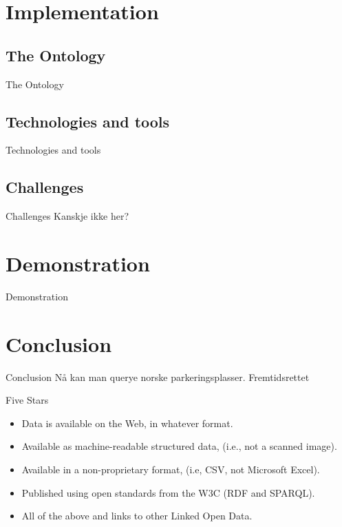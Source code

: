 \documentclass{beamer}
\begin{document}
	\section{Implementation}
	\subsection{The Ontology}
	\begin{frame}{The Ontology}
	\end{frame}

	\subsection{Technologies and tools}
	\begin{frame}{Technologies and tools}
	\end{frame}

	\subsection{Challenges}
	\begin{frame}{Challenges}
		Kanskje ikke her?
	\end{frame}

	\section{Demonstration}
	\begin{frame}{Demonstration}
	\end{frame}

	\section{Conclusion}
	\begin{frame}{Conclusion}
		Nå kan man querye norske parkeringsplasser.
		Fremtidsrettet
	\end{frame}

	\begin{frame}{Five Stars}
		\begin{itemize}
			\item Data is available on the Web, in whatever format.
			\item Available as machine-readable structured data, (i.e., not a scanned image).
			\item Available in a non-proprietary format, (i.e, CSV, not Microsoft Excel).
			\item Published using open standards from the W3C (RDF and SPARQL).
			\item All of the above and links to other Linked Open Data.
		\end{itemize}
	\end{frame}
\end{document}
